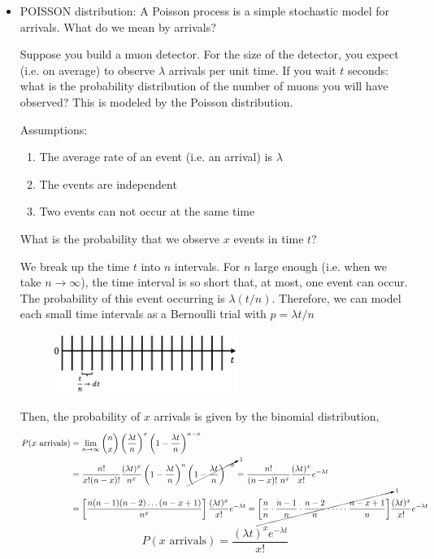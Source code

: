 \documentclass[12pt]{article}
\numberwithin{equation}{section}
\begin{document}
\begin{itemize}
\item POISSON distribution: A Poisson process is a simple stochastic model for arrivals. What do we mean by arrivals?

Suppose you build a muon detector. For the size of the detector, you expect (i.e. on average) to observe $ \lambda $ arrivals per unit time. If you wait $ t $ seconds: what is the probability distribution of the number of muons you will have observed? This is modeled by the Poisson distribution.

Assumptions:
\begin{enumerate}
	\item The average rate of an event (i.e. an arrival) is $ \lambda $
	\item The events are independent
	\item Two events can not occur at the same time
\end{enumerate}

What is the probability that we observe $ x $ events in time $ t $?

We break up the time $ t $ into $ n $ intervals. For $ n $ large enough (i.e. when we take $ n\to\infty $), the time interval is so short that, at most, one event can occur. The probability of this event occurring is $ \lambda (t/n) $. Therefore, we can model each small time intervals as a Bernoulli trial with $ p=\lambda t/n $ 

\begin{figure}[H]
	\centering
	\includegraphics[width=6cm] {poi}
\end{figure}

Then, the probability of $ x $ arrivals is given by the binomial distribution, 
{\footnotesize
\begin{align*}
		P(x \text{ arrivals}) &= \lim_{n\to\infty} {n \choose x} \left(\frac{\lambda t}{n}\right)^x \left(1-\frac{\lambda t}{n}\right)^{n-x}\\
		&= \frac{n!}{x!(n-x)!}\frac{(\lambda t)^x}{n^x}\left(1-\frac{\lambda t}{n}\right)^{n} \cancelto{_1}{\left(1-\frac{\lambda t}{n}\right)^{-x}}= \frac{n!}{(n-x)!\ n^x}\frac{(\lambda t)^x}{x!} e^{-\lambda t} \\
		&= \left[\frac{n(n-1)(n-2)\dots (n-x+1)}{n^x}\right]\frac{(\lambda t)^x}{x!}  e^{-\lambda t}= \cancelto{_1}{\left[ \frac{n}{n} \cdot \frac{n-1}{n} \cdot \frac{n-2}{n} \cdot \dots \cdot \frac{n-x+1}{n} \right]}\frac{(\lambda t)^x}{x!}  e^{-\lambda t}\\
\end{align*}}
\begin{equation}
		P(x \text{ arrivals}) = \frac{(\lambda t)^x  e^{-\lambda t}}{x!}
\end{equation}


\end{itemize}
\end{document}
